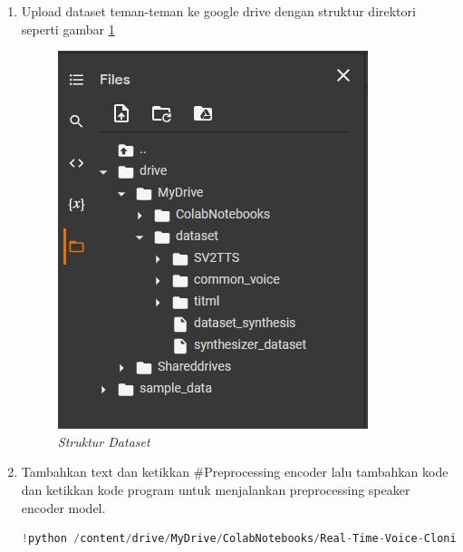 \begin{enumerate}
\begin{lstlisting}[language=Python, caption=Preprocessing Encoder Model, label=lstencoder]
    # Preprocess the datasets
    print_args(args, parser)
    preprocess_func = {
      "titml": preprocess_speech_dataset,
      "common_voice": preprocess_clean_dataset, 
    }
    args = vars(args)
    for dataset in args.pop("datasets"):
        print("Preprocessing %s" % dataset)
        preprocess_func[dataset](**args)
\end{lstlisting}

Pada argument dataset masukkan nama dataset yang teman-teman gunakan, pada kode diatas saya menggunakan dataset titml dan common voice berbahasa indonesia.

\item Upload dataset teman-teman ke google drive dengan struktur direktori seperti gambar \ref{colab9}
\begin{figure}[H]
    \centering
    \includegraphics[scale=0.75]{figures/colab9}
    \caption{\textit{Struktur Dataset}}
    \label{colab9}
\end{figure}

\item Tambahkan text dan ketikkan \#Preprocessing encoder lalu tambahkan kode dan ketikkan kode program untuk menjalankan preprocessing speaker encoder model.

\begin{lstlisting}[language=Python, caption=Script to Run Preprocessing Speaker Encoder Model]
!python /content/drive/MyDrive/ColabNotebooks/Real-Time-Voice-Cloning/encoder_preprocess.py /content/drive/MyDrive/dataset
\end{lstlisting}


\end{enumerate}
